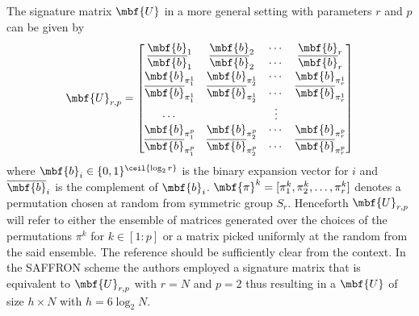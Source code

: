 \documentclass[conference,,twocolumn]{IEEEtran}
\begin{document}
 
 The signature matrix 	$\mbf{U}$ in a more general setting with parameters $r$ and $p$ can be given by
 \begin{align}
\label{Eqn:SignatureMatrix}
\mbf{U}_{r,p}=\begin{bmatrix}
\mbf{b}_1  & \mbf{b}_2 &\cdots & \mbf{b}_r \\
\overline{\mbf{b}}_1 & \overline{\mbf{b}}_2 & \cdots & \overline{\mbf{b}}_r\\
\mbf{b}_{\pi^{1}_{1}} & \mbf{b}_{\pi^{1}_{2}} & \cdots & \mbf{b}_{\pi^{1}_{r}}\\
\overline{\mbf{b}}_{\pi^{1}_{1}} & \overline{\mbf{b}}_{\pi^{1}_{2}} & \cdots & \overline{\mbf{b}}_{\pi^{1}_{r}}\\
\cdots &  &\vdots \\
\mbf{b}_{\pi^{p}_{1}} & \mbf{b}_{\pi^{p}_{2}} & \cdots & \mbf{b}_{\pi^{p}_{r}}\\
\overline{\mbf{b}}_{\pi^{p}_{1}} & \overline{\mbf{b}}_{\pi^{p}_{2}} & \cdots & \overline{\mbf{b}}_{\pi^{p}_{r}}
\end{bmatrix}
\end{align}  
where $\mbf{b}_{i}\in\{0,1\}^{\ceil{\log_{2}r}}$ is the binary expansion vector for $i$ and $\overline{\mbf{b}}_{i}$ is the complement of $\mbf{b}_{i}$. $\mbf{\pi}^{k}=[\pi^{k}_1,\pi^{k}_2,\ldots,\pi^{k}_r]$ denotes a permutation chosen at random from symmetric group $S_{r}$. Henceforth $\mbf{U}_{r,p}$ will refer to either the ensemble of matrices generated over the choices of the permutations $\pi^{k}$ for $k\in[1:p]$ or a matrix picked uniformly at the random from the said ensemble. The reference should be sufficiently clear from the context. In the SAFFRON scheme the authors employed a signature matrix that is equivalent to $\mbf{U}_{r,p}$ with $r=N$ and $p=2$ thus resulting in a $\mbf{U}$ of size $h \times N$ with $h=6\log_{2}N$. 
\end{document}
